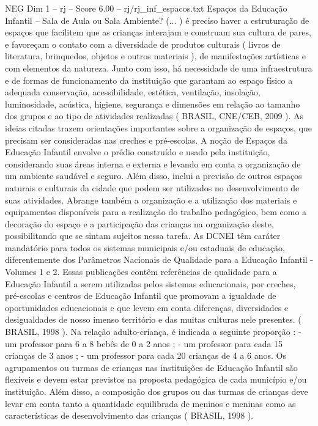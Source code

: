 \begin{textsample}{NEG Dim 1 – rj – Score 6.00 – rj/rj\_inf\_espacos.txt}  \label{ex:f1_neg_016}
Espaços da Educação Infantil – Sala de Aula ou Sala Ambiente? (... ) é preciso haver a estruturação de espaços que facilitem que as crianças interajam e construam sua cultura de pares, e favoreçam o contato com a diversidade de produtos culturais ( livros de literatura, brinquedos, objetos e outros materiais ), de manifestações artísticas e com elementos da natureza.
Junto com isso, há necessidade de uma infraestrutura e de formas de funcionamento da instituição que garantam ao espaço físico a adequada conservação, acessibilidade, estética, ventilação, insolação, luminosidade, acústica, higiene, segurança e dimensões em relação ao tamanho dos grupos e ao tipo de atividades realizadas ( BRASIL, CNE/CEB, 2009 ).
As ideias citadas trazem orientações importantes sobre a organização de espaços, que precisam ser consideradas nas creches e pré-escolas.
A noção de Espaços da Educação Infantil envolve o prédio construído e usado pela instituição, considerando suas áreas interna e externa e levando em conta a organização de um ambiente saudável e seguro.
Além disso, inclui a previsão de outros espaços naturais e culturais da cidade que podem ser utilizados no desenvolvimento de suas atividades.
Abrange também a organização e a utilização dos materiais e equipamentos disponíveis para a realização do trabalho pedagógico, bem como a decoração do espaço e a participação das crianças na organização deste, possibilitando que se sintam sujeitos nessa tarefa.
As DCNEI têm caráter mandatório para todos os sistemas municipais e/ou estaduais de educação, diferentemente dos Parâmetros Nacionais de Qualidade para a Educação Infantil - Volumes 1 e 2.
Essas publicações contêm referências de qualidade para a Educação Infantil a serem utilizadas pelos sistemas educacionais, por creches, pré-escolas e centros de Educação Infantil que promovam a igualdade de oportunidades educacionais e que levem em conta diferenças, diversidades e desigualdades de nosso imenso território e das muitas culturas nele presentes. ( BRASIL, 1998 ).
Na relação adulto-criança, é indicada a seguinte proporção : - um professor para 6 a 8 bebês de 0 a 2 anos ; - um professor para cada 15 crianças de 3 anos ; - um professor para cada 20 crianças de 4 a 6 anos.
Os agrupamentos ou turmas de crianças nas instituições de Educação Infantil são flexíveis e devem estar previstos na proposta pedagógica de cada município e/ou instituição.
Além disso, a composição dos grupos ou das turmas de crianças deve levar em conta tanto a quantidade equilibrada de meninos e meninas como as características de desenvolvimento das crianças ( BRASIL, 1998 ).

\end{textsample}
